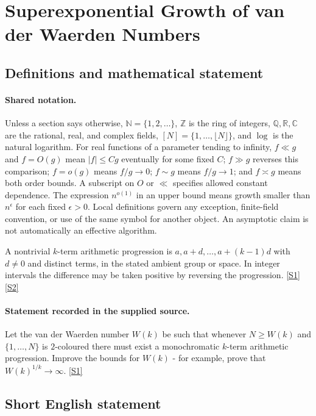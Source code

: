 \documentclass[11pt,a4paper]{article}
\newcommand{\N}{\mathbb{N}}
\newcommand{\Z}{\mathbb{Z}}
\newcommand{\Q}{\mathbb{Q}}
\newcommand{\R}{\mathbb{R}}
\newcommand{\C}{\mathbb{C}}
\newcommand{\sref}[2]{\hyperlink{source:#1:#2}{[S#2]}}
\begin{document}
\section{Superexponential Growth of van der Waerden Numbers}\label{statement}


\subsection{Definitions and mathematical statement}

\paragraph{Shared notation.}Unless a section says otherwise, $\N=\{1,2,\ldots\}$,
$\Z$ is the ring of integers, $\Q,\R,\C$ are the rational, real, and complex
fields, $[N]=\{1,\ldots,\lfloor N\rfloor\}$, and $\log$ is the natural
logarithm. For real functions of a parameter tending to infinity,
$f\ll g$ and $f=O(g)$ mean $|f|\leq Cg$ eventually for some fixed $C$;
$f\gg g$ reverses this comparison; $f=o(g)$ means $f/g\to0$;
$f\sim g$ means $f/g\to1$; and $f\asymp g$ means both order bounds.
A subscript on $O$ or $\ll$ specifies allowed constant dependence.
The expression $n^{o(1)}$ in an upper bound means growth smaller than
$n^\epsilon$ for each fixed $\epsilon>0$. Local definitions govern any
exception, finite-field convention, or use of the same symbol for another
object. An asymptotic claim is not automatically an effective algorithm.



A nontrivial $k$-term arithmetic progression is $a,a+d,\ldots,a+(k-1)d$ with $d\ne0$ and distinct terms, in the stated ambient group or space. In integer intervals the difference may be taken positive by reversing the progression. \sref{statement}{1} \sref{statement}{2}

\paragraph{Statement recorded in the supplied source.}
Let the van der Waerden number $W(k)$ be such that whenever $N\geq W(k)$ and $\{1,\ldots,N\}$ is $2$-coloured there must exist a monochromatic $k$-term arithmetic progression. Improve the bounds for $W(k)$ - for example, prove that $W(k)^{1/k}\to \infty$. \sref{statement}{1}

\subsection{Short English statement}
\end{document}

